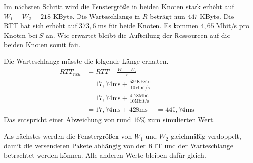 \documentclass [10pt,a4paper]{article}
\begin{document}
		Im nächsten Schritt wird die Fenstergröße in beiden Knoten stark erhöht auf $W_1=W_2=218$ KByte. Die Warteschlange in $R$ beträgt nun $447$ KByte. Die RTT hat sich erhöht auf $373,6$ ms für beide Knoten. Es kommen $4,65$ Mbit/s pro Knoten bei $S$ an. Wie erwartet bleibt die Aufteilung der Ressourcen auf die beiden Knoten somit fair.
		
		Die Warteschlange müsste die folgende Länge erhalten.
		\begin{align*}
			RTT_{neu} &= RTT+ \frac{W_1+W_2}{r} \\
			&= 17,74 \text{ms} + \frac{536 \text{KByte}}{10 \text{Mbit/s}} \\
			&= 17,74 \text{ms} + \frac{4,28 \text{Mbit}}{10 \text{Mbit/s}} \\
			&= 17,74 \text{ms} + 428 \text{ms}
			&= 445,74 \text{ms}
		\end{align*}
		Das entspricht einer Abweichung von rund $16\%$ zum simulierten Wert.
		
		Als nächstes werden die Fenstergrößen von $W_1$ und $W_2$ gleichmäßig verdoppelt, damit die versendeten Pakete abhängig von der RTT und der Warteschlange betrachtet werden können. Alle anderen Werte bleiben dafür gleich.
		
\end{document}
